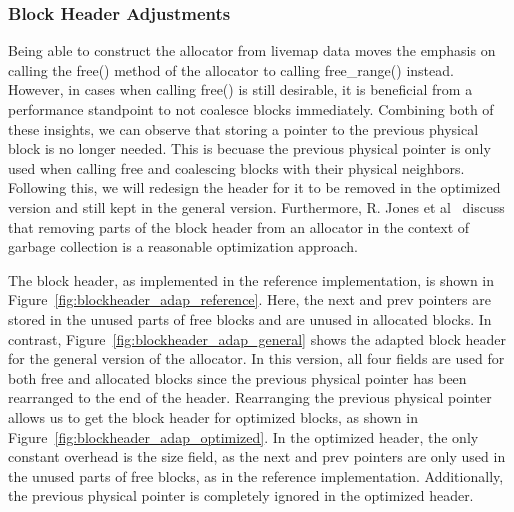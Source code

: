 \subsubsection{Block Header Adjustments}

Being able to construct the allocator from livemap data moves the emphasis on calling the free() method of the allocator to calling free\_range() instead. However, in cases when calling free() is still desirable, it is beneficial from a performance standpoint to not coalesce blocks immediately. Combining both of these insights, we can observe that storing a pointer to the previous physical block is no longer needed. This is becuase the previous physical pointer is only used when calling free and coalescing blocks with their physical neighbors. Following this, we will redesign the header for it to be removed in the optimized version and still kept in the general version. Furthermore, R. Jones et al~\cite[Page 103]{gchandbook} discuss that removing parts of the block header from an allocator in the context of garbage collection is a reasonable optimization approach.


The block header, as implemented in the reference implementation, is shown in Figure~\ref{fig:blockheader_adap_reference}. Here, the next and prev pointers are stored in the unused parts of free blocks and are unused in allocated blocks. In contrast, Figure~\ref{fig:blockheader_adap_general} shows the adapted block header for the general version of the allocator. In this version, all four fields are used for both free and allocated blocks since the previous physical pointer has been rearranged to the end of the header. Rearranging the previous physical pointer allows us to get the block header for optimized blocks, as shown in Figure~\ref{fig:blockheader_adap_optimized}. In the optimized header, the only constant overhead is the size field, as the next and prev pointers are only used in the unused parts of free blocks, as in the reference implementation. Additionally, the previous physical pointer is completely ignored in the optimized header.


